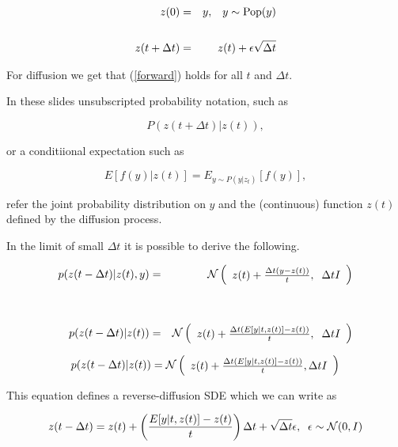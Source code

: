 {{\huge
\begin{eqnarray}
  z(0) & = & y,\;\;\;y \sim \mathrm{Pop}(y) \nonumber \\
  \nonumber \\
  z(t+\Delta t) & = & z(t) + \epsilon\sqrt{\Delta t} \label{forward}
\end{eqnarray}
}



\vfill
For diffusion we get that (\ref{forward}) holds for all $t$ and $\Delta t$.


In these slides unsubscripted probability notation, such as

\vfill
$$P(z(t+\Delta t)|z(t)),$$

\vfill
or a conditiional expectation such as

\vfill
$$E[f(y)|z(t)] = E_{y \sim P(y|z_t)}[f(y)],$$

\vfill
refer the joint probability distribution on $y$ and the (continuous) function $z(t)$
defined by the diffusion process.


In the limit of small $\Delta t$ it is possible to derive the following.

\vfill
\begin{eqnarray*}
  p(z(t - \Delta t)|z(t),y) & = & {\cal N}\left(\begin{array}{l}z(t) + \frac{\Delta t(y - z(t))}{t},\;\; \Delta t I\end{array}\right) \\
  \\
  \\
  p(z(t - \Delta t)|z(t)) & = & {\cal N}\left(\begin{array}{l} z(t) + \frac{\Delta t(E[y|t,z(t)] - z(t))}{t}, \;\; \Delta t I\end{array}\right)
\end{eqnarray*}



$$p(z(t - \Delta t)|z(t)) = {\cal N}\left(\begin{array}{l} z(t) + \frac{\Delta t(E[y|t,z(t)] - z(t))}{t}, \Delta t I\end{array}\right)$$

\vfill
This equation defines a reverse-diffusion SDE which we can write as

{\huge
$$z(t - \Delta t) = z(t) + \left(\frac{E[y|t,z(t)] - z(t)}{t}\right)\Delta t + \sqrt{\Delta t} \epsilon,\;\;\epsilon \sim {\cal N}(0,I)$$
}

}
